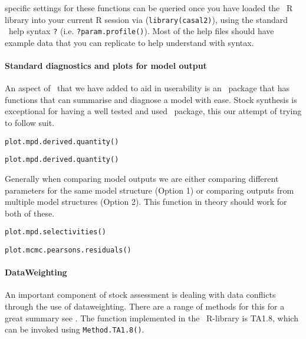 specific settings for these functions can be queried once you have loaded the \CNAME\ R library into your current R session via (\texttt{library(casal2)}), using the standard \R\ help syntax \texttt{?} (i.e. \texttt{?param.profile()}). Most of the help files should have example data that you can replicate to help understand with syntax.
\\
\paragraph*{Standard diagnostics and plots for model output}
An aspect of \CNAME\ that we have added to aid in userability is an \R\ package that has functions that can summarise and diagnose a model with ease. Stock synthesis is exceptional for having a well tested and used \R\ package, this our attempt of trying to follow suit.

\texttt{plot.mpd.derived.quantity()}

\texttt{plot.mpd.derived.quantity()}

Generally when comparing model outputs we are either comparing different parameters for the same model structure (Option 1) or comparing outputs from multiple model structures (Option 2). This function in theory should work for both of these.

\texttt{plot.mpd.selectivities()}


\texttt{plot.mcmc.pearsons.residuals()}


\paragraph*{DataWeighting}
An important component of stock assessment is dealing with data conflicts through the use of dataweighting. There are a range of methods for this for a great summary see \cite{francis2011data}. The function implemented in the \CNAME\ R-library is TA1.8, which can be invoked using \texttt{Method.TA1.8()}.

